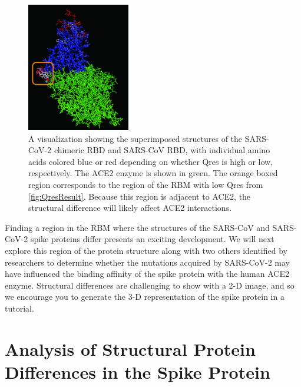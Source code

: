 \begin{figure}[h]
	\centering
	\mySfFamily
	\includegraphics[width = 0.4\textwidth]{../images_CMYK/QresVMD}
	\caption{A visualization showing the superimposed structures of the SARS-CoV-2 chimeric RBD  and SARS-CoV RBD, with individual amino acids colored blue or red depending on whether Qres is high or low, respectively.  The ACE2 enzyme is shown in green. The orange boxed region corresponds to the region of the RBM with low Qres from \autoref{fig:QresResult}. Because this region is adjacent to ACE2, the structural difference will likely affect ACE2 interactions.}
	\label{fig:QresVMD}
\end{figure}

\begin{note}\end{note}

Finding a region in the RBM where the structures of the SARS-CoV and SARS-CoV-2 spike proteins differ presents an exciting development. We will next explore this region of the protein structure along with two others identified by researchers to determine whether the mutations acquired by SARS-CoV-2 may have influenced the binding affinity of the spike protein with the human ACE2 enzyme. Structural differences are challenging to show with a 2-D image, and so we encourage you to generate the 3-D representation of the spike protein in a tutorial.\\

\FloatBarrier
{}
\section{Analysis of Structural Protein Differences in the Spike Protein}
\label{sec:structural_differences}


